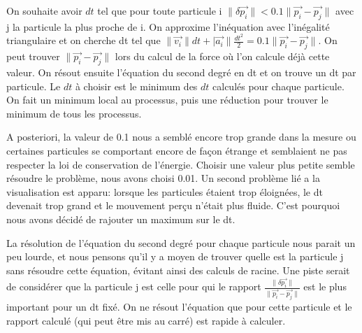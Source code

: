 On souhaite avoir $dt$ tel que pour toute particule i $\|\delta \overrightarrow{p_i}\| < 0.1 \|\overrightarrow{p_i} - \overrightarrow{p_j}\|$ avec j la particule la plus proche de i. On approxime l'inéquation avec l'inégalité triangulaire et on cherche dt tel que $\|\overrightarrow{v_i}\|dt + |\overrightarrow{a_i}\|\frac{dt^2}{2} = 0.1 \|\overrightarrow{p_i} - \overrightarrow{p_j}\|$. On peut trouver $\|\overrightarrow{p_i} - \overrightarrow{p_j}\|$ lors du calcul de la force où l'on calcule déjà cette valeur. On résout ensuite l'équation du second degré en dt et on trouve un dt par particule. Le $dt$ à choisir est le minimum des $dt$ calculés pour chaque particule. On fait un minimum local au processus, puis une réduction pour trouver le minimum de tous les processus.

A posteriori, la valeur de 0.1 nous a semblé encore trop grande dans la mesure ou certaines particules se comportant encore de façon étrange et semblaient ne pas respecter la loi de conservation de l'énergie. Choisir une valeur plus petite semble résoudre le problème, nous avons choisi 0.01. Un second problème lié a la visualisation est apparu: lorsque les particules étaient trop éloignées, le dt devenait trop grand et le mouvement perçu n'était plus fluide. C'est pourquoi nous avons décidé de rajouter un maximum sur le dt.

La résolution de l'équation du second degré pour chaque particule nous parait un peu lourde, et nous pensons qu'il y a moyen de trouver quelle est la particule j sans résoudre cette équation, évitant ainsi des calculs de racine. Une piste serait de considérer que la particule j est celle pour qui le rapport $\frac{\|\delta \overrightarrow{p_i}\|}{\|\overrightarrow{p_i} - \overrightarrow{p_j}\|}$ est le plus important pour un dt fixé. On ne résout l'équation que pour cette particule et le rapport calculé (qui peut être mis au carré) est rapide à calculer.

